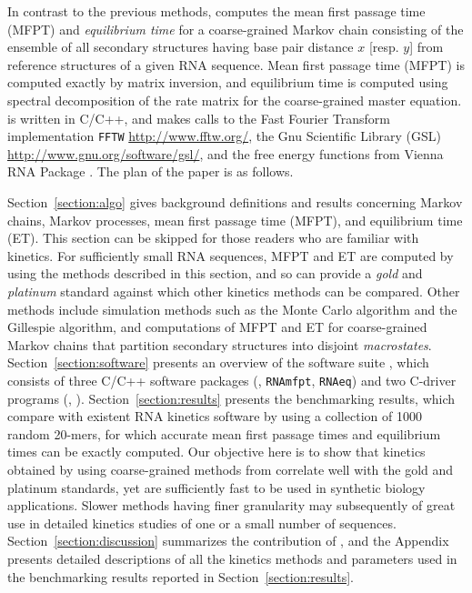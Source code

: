 In contrast to the previous methods, \hermes computes the mean
first passage time (MFPT) and {\em equilibrium time} for a
coarse-grained Markov chain consisting of the ensemble of all
secondary structures having base pair distance $x$ [resp. $y$] from
reference structures  of a given RNA sequence.
Mean first passage time (MFPT) is computed exactly by matrix inversion,
and equilibrium time is computed using spectral decomposition of the rate
matrix for the coarse-grained master equation.
\hermes is written in C/C++, and
makes calls to the Fast Fourier Transform implementation {\tt FFTW}
\citep{FFTW05} \url{http://www.fftw.org/}, the Gnu Scientific Library
(GSL) \url{http://www.gnu.org/software/gsl/}, and the free energy
functions from Vienna RNA Package \citep{Lorenz.amb11}. The plan of the
paper is as follows.

Section~\ref{section:algo} gives background definitions and results
concerning Markov chains, Markov processes, mean first passage time (MFPT),
and equilibrium time (ET). This section can be skipped for those readers
who are familiar with kinetics. For sufficiently small RNA sequences, MFPT and
ET are computed by \hermes using the methods described in this section,
and so can provide a {\em gold} and {\em platinum} standard against which
other kinetics methods can be compared. Other methods include
simulation methods such as the Monte Carlo algorithm and the Gillespie
algorithm, and computations of MFPT and ET for coarse-grained Markov
chains that partition secondary structures into disjoint {\em macrostates}.
Section~\ref{section:software} presents an overview of the software suite
\hermes, which consists of three C/C++ software packages
(\ffttwo, {\tt RNAmfpt}, {\tt RNAeq}) and two C-driver programs
(\fftmfpt, \ffteq).
Section~\ref{section:results} presents the benchmarking results,
which compare \hermes with
existent RNA kinetics software by using a collection of 1000
random 20-mers, for which accurate mean first passage times and equilibrium
times can be exactly computed. Our objective here is to show that kinetics
obtained by using coarse-grained methods from \hermes correlate well
with the gold and platinum standards, yet are sufficiently fast to be used
in synthetic biology applications. Slower methods having finer granularity
may subsequently of great use in detailed kinetics studies of one or
a small number of sequences.
Section~\ref{section:discussion} summarizes the contribution
of \hermes, and the Appendix presents detailed descriptions of
all the kinetics methods and parameters used in the benchmarking results
reported in Section~\ref{section:results}.



